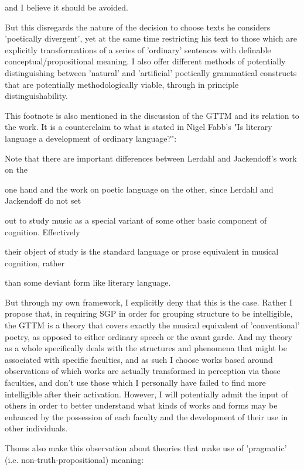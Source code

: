 \documentclass[]{article}
\begin{document}
and I believe it should be avoided.



But this disregards the nature of the decision to choose texts he considers 'poetically divergent', yet at the same time restricting his text to those which are explicitly transformations of a series of 'ordinary' sentences with definable conceptual/propositional meaning. I also offer different methods of potentially distinguishing between 'natural' and 'artificial' poetically grammatical constructs that are potentially methodologically viable, through in principle distinguishability.



This footnote is also mentioned in the discussion of the GTTM and its relation to the work. It is a counterclaim to what is stated in Nigel Fabb's "Is literary language a development of ordinary language?":


Note that there are important differences between Lerdahl and Jackendoff’s work on the

one hand and the work on poetic language on the other, since Lerdahl and Jackendoff do not set

out to study music as a special variant of some other basic component of cognition. Effectively

their object of study is the standard language or prose equivalent in musical cognition, rather

than some deviant form like literary language.



But through my own framework, I explicitly deny that this is the case. Rather I propose that, in requiring SGP in order for grouping structure to be intelligible, the GTTM is a theory that covers exactly the musical equivalent of 'conventional' poetry, as opposed to either ordinary speech or the avant garde. And my theory as a whole specifically deals with the structures and phenomena that might be associated with specific faculties, and as such I choose works based around observations of which works are actually transformed in perception via those faculties, and don't use those which I personally have failed to find more intelligible after their activation. However, I will potentially admit the input of others in order to better understand what kinds of works and forms may be enhanced by the possession of each faculty and the development of their use in other individuals.



Thoms also make this observation about theories that make use of 'pragmatic' (i.e. non-truth-propositional) meaning:
\end{document}
